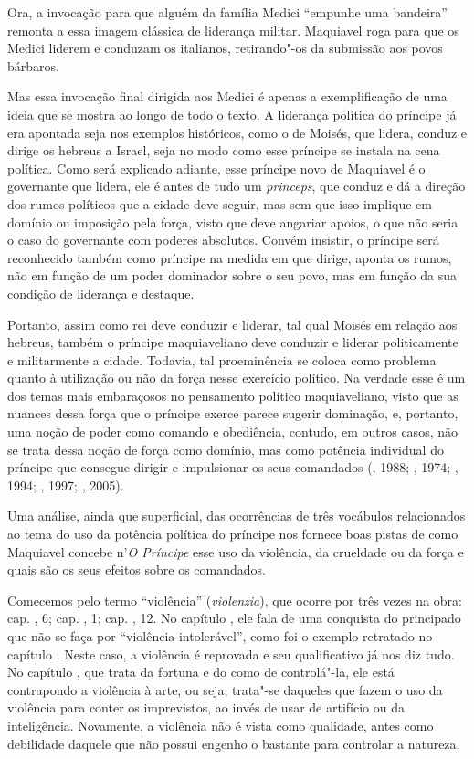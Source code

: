 Ora, a invocação para que alguém da família Medici ``empunhe uma
bandeira'' remonta a essa imagem clássica de liderança militar.
Maquiavel roga para que os Medici liderem e conduzam os italianos,
retirando"-os da submissão aos povos bárbaros.

Mas essa invocação final dirigida aos Medici é apenas a exemplificação
de uma ideia que se mostra ao longo de todo o texto. A liderança
política do príncipe já era apontada seja nos exemplos históricos, como
o de Moisés, que lidera, conduz e dirige os hebreus a Israel, seja no
modo como esse príncipe se instala na cena política. Como será explicado
adiante, esse príncipe novo de Maquiavel é o governante que lidera, ele
é antes de tudo um \emph{princeps}, que conduz e dá a direção dos rumos
políticos que a cidade deve seguir, mas sem que isso implique em domínio
ou imposição pela força, visto que deve angariar apoios, o que não seria
o caso do governante com poderes absolutos. Convém insistir, o príncipe
será reconhecido também como príncipe na medida em que dirige, aponta os
rumos, não em função de um poder dominador sobre o seu povo, mas em
função da sua condição de liderança e destaque.

Portanto, assim como rei deve conduzir e liderar, tal qual Moisés em
relação aos hebreus, também o príncipe maquiaveliano deve conduzir e
liderar politicamente e militarmente a cidade. Todavia, tal proeminência
se coloca como problema quanto à utilização ou não da força nesse
exercício político. Na verdade esse é um dos temas mais embaraçosos no
pensamento político maquiaveliano, visto que as nuances dessa força que
o príncipe exerce parece sugerir dominação, e, portanto, uma noção de
poder como comando e obediência, contudo, em outros casos, não se trata
dessa noção de força como domínio, mas como potência individual do
príncipe que consegue dirigir e impulsionar os seus comandados (,
1988; , 1974; , 1994; , 1997; , 2005).

Uma análise, ainda que superficial, das ocorrências de três vocábulos
relacionados ao tema do uso da potência política do príncipe nos fornece
boas pistas de como Maquiavel concebe n'\emph{O Príncipe} esse uso da
violência, da crueldade ou da força e quais são os seus efeitos sobre os
comandados.

Comecemos pelo termo ``violência'' (\emph{violenzia}), que ocorre por
três vezes na obra: cap. , 6; cap. , 1; cap. , 12. No capítulo
, ele fala de uma conquista do principado que não se faça por
``violência intolerável'', como foi o exemplo retratado no capítulo
. Neste caso, a violência é reprovada e seu qualificativo já nos diz
tudo. No capítulo , que trata da fortuna e do como de controlá"-la,
ele está contrapondo a violência à arte, ou seja, trata"-se daqueles que
fazem o uso da violência para conter os imprevistos, ao invés de usar de
artifício ou da inteligência. Novamente, a violência não é vista como
qualidade, antes como debilidade daquele que não possui engenho o
bastante para controlar a natureza.

